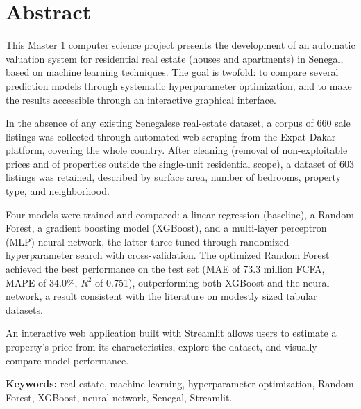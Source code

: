 \chapter*{Abstract}

This Master 1 computer science project presents the development of an automatic valuation
system for residential real estate (houses and apartments) in Senegal, based on machine
learning techniques. The goal is twofold: to compare several prediction models through
systematic hyperparameter optimization, and to make the results accessible through an
interactive graphical interface.

In the absence of any existing Senegalese real-estate dataset, a corpus of 660 sale listings
was collected through automated web scraping from the Expat-Dakar platform, covering the
whole country. After cleaning (removal of non-exploitable prices and of properties outside the
single-unit residential scope), a dataset of 603 listings was retained, described by surface
area, number of bedrooms, property type, and neighborhood.

Four models were trained and compared: a linear regression (baseline), a Random Forest, a
gradient boosting model (XGBoost), and a multi-layer perceptron (MLP) neural network, the
latter three tuned through randomized hyperparameter search with cross-validation. The
optimized Random Forest achieved the best performance on the test set (MAE of 73.3 million
FCFA, MAPE of 34.0\%, $R^2$ of 0.751), outperforming both XGBoost and the neural network, a
result consistent with the literature on modestly sized tabular datasets.

An interactive web application built with Streamlit allows users to estimate a property's
price from its characteristics, explore the dataset, and visually compare model performance.

\vspace{0.5cm}
\noindent\textbf{Keywords:} real estate, machine learning, hyperparameter optimization, Random
Forest, XGBoost, neural network, Senegal, Streamlit.

